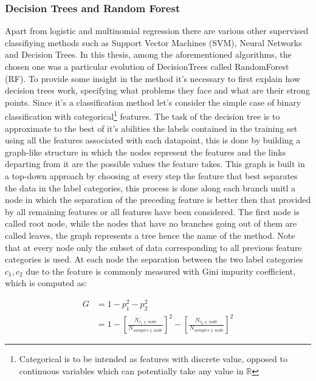 \subsubsection{Decision Trees and Random Forest}
Apart from logistic and multinomial regression there are various other supervised classifiying methods such as Support Vector Machines (SVM), Neural Networks and Decision Trees. In this thesis, among the aforementioned algorithms, the chosen one was a particular evolution of DecisionTrees called RandomForest (RF).
To provide some insight in the method it's necessary to first explain how decision trees work, specifying what problems they face and what are their strong points.
Since it's a classification method let's consider the simple case of binary classification with categorical\footnote{Categorical is to be intended as features with discrete value, opposed to continuous variables which can potentially take any value in $\mathbb{R}$} features. The task of the decision tree is to approximate to the best of it's abilities the labels contained in the training set using all the features associated with each datapoint, this is done by building a graph-like structure in which the nodes represent the features and the links departing from it are the possible values the feature takes. This graph is built in a top-down approach by choosing at every step the feature that best separates the data in the label categories, this process is done along each branch unitl a node in which the separation of the preceding feature is better then that provided by all remaining features or all features have been considered. The first node is called root node, while the nodes that have no branches going out of them are called leaves, the graph represents a tree hence the name of the method. Note that at every node only the subset of data corresponding to all previous feature categories is used.
At each node the separation between the two label categories $c_1, c_2$ due to the feature is commonly measured with Gini impurity coefficient, which is computed as:

\begin{equation}
	\begin{split}
		G &= 1 - p^2_1 -p^2_2 \\
		   &= 1 - \left[ \frac{N_{c_1\in node}}{N_{samples\in node} } \right]^2 - \left[\frac{N_{c_2\in node}}{N_{samples\in node}} \right]^2
	\end{split}
\end{equation}

